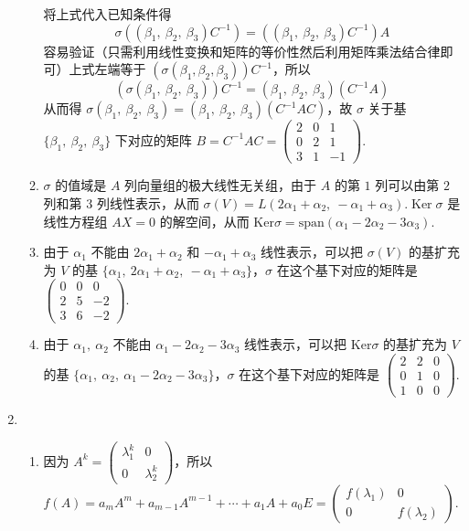 \begin{enumerate}
\begin{enumerate}
        将上式代入已知条件得
        \[\sigma\left(\left(\beta_{1},\ \beta_{2},\ \beta_{3}\right) C^{-1}\right)=\left(\left(\beta_{1},\ \beta_{2},\ \beta_{3}\right) C^{-1}\right) A\]
        容易验证（只需利用线性变换和矩阵的等价性然后利用矩阵乘法结合律即可）上式左端等于 $(\sigma(\beta_{1}, \beta_{2}, \beta_{3})) C^{-1}$，所以
        \[(\sigma(\beta_{1},\ \beta_{2},\ \beta_{3})) C^{-1}=(\beta_{1},\ \beta_{2},\ \beta_{3})(C^{-1} A)\]
        从而得 $\sigma(\beta_{1},\ \beta_{2},\ \beta_{3})=(\beta_{1},\ \beta_{2},\ \beta_{3})(C^{-1} A C)$，故 $\sigma$ 关于基 $\{\beta_{1},\ \beta_{2},\ \beta_{3}\}$ 下对应的矩阵 $B=C^{-1} A C=\begin{pmatrix}2 & 0 & 1 \\ 0 & 2 & 1 \\ 3 & 1 & -1\end{pmatrix}$.
        \item $\sigma$ 的值域是 $A$ 列向量组的极大线性无关组，由于 $A $ 的第 $1$ 列可以由第 $2$ 列和第 $3$ 列线性表示，从而 $\sigma(V)=L(2 \alpha_{1}+\alpha_{2},\ -\alpha_{1}+\alpha_{3})$.$\operatorname{Ker} \sigma$ 是线性方程组 $AX=0$ 的解空间，从而 $\mathrm{Ker} \sigma=\mathrm{span}(\alpha_{1}-2 \alpha_{2}-3 \alpha_{3})$.
        \item 由于 $\alpha_{1}$ 不能由 $2 \alpha_{1}+\alpha_{2}$ 和 $-\alpha_{1}+\alpha_{3}$ 线性表示，可以把 $\sigma(V)$ 的基扩充为 $V$ 的基 $\{\alpha_{1},\ 2 \alpha_{1}+\alpha_{2},\ -\alpha_{1}+\alpha_{3}\}$，$\sigma$ 在这个基下对应的矩阵是 $\begin{pmatrix}0 & 0 & 0 \\ 2 & 5 & -2 \\ 3 & 6 & -2\end{pmatrix}$.
        \item 由于 $\alpha_{1},\ \alpha_{2}$ 不能由 $\alpha_{1}-2 \alpha_{2}-3 \alpha_{3}$ 线性表示，可以把 $\mathrm{Ker} \sigma$ 的基扩充为 $V$ 的基 $\{\alpha_{1},\ \alpha_{2},\ \alpha_{1}-2 \alpha_{2}-3 \alpha_{3}\}$，$\sigma$ 在这个基下对应的矩阵是 $\begin{pmatrix}2 & 2 & 0 \\ 0 & 1 & 0 \\ 1 & 0 & 0\end{pmatrix}$.
    \end{enumerate}
    \item \begin{enumerate}
        \item 因为 $A^k=\begin{pmatrix}\lambda_1^k & 0 \\ 0 & \lambda_2^k\end{pmatrix}$，所以 $f(A)=a_mA^m+a_{m-1}A^{m-1}+\cdots+a_1A+a_0E = \begin{pmatrix}f(\lambda_1) & 0 \\ 0 & f(\lambda_2)\end{pmatrix}$.

\end{enumerate}
\end{enumerate}
